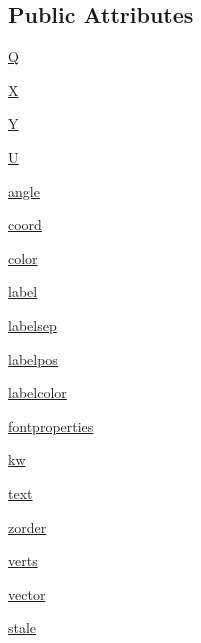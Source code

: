 \subsection*{Public Attributes}
\begin{DoxyCompactItemize}
\item 
\hyperlink{classmatplotlib_1_1quiver_1_1QuiverKey_a87241e8441235ea44da1e26fa249c67f}{Q}
\item 
\hyperlink{classmatplotlib_1_1quiver_1_1QuiverKey_a677b96d69627db6cf8271ace161e4920}{X}
\item 
\hyperlink{classmatplotlib_1_1quiver_1_1QuiverKey_a79d4345f46bc99ce0c3d11cd1001c503}{Y}
\item 
\hyperlink{classmatplotlib_1_1quiver_1_1QuiverKey_a24e4cdf1a8fe12f3a1da49dd55dd614c}{U}
\item 
\hyperlink{classmatplotlib_1_1quiver_1_1QuiverKey_ab781e7037ad3d4d853fd80862f87841a}{angle}
\item 
\hyperlink{classmatplotlib_1_1quiver_1_1QuiverKey_ada90bec5274f6ab30bac47644119aea7}{coord}
\item 
\hyperlink{classmatplotlib_1_1quiver_1_1QuiverKey_a43b0eb9bfaf8244e74093582cc060410}{color}
\item 
\hyperlink{classmatplotlib_1_1quiver_1_1QuiverKey_a5f746ef608190ecafe748ca3a6e79010}{label}
\item 
\hyperlink{classmatplotlib_1_1quiver_1_1QuiverKey_a3e3c2f5f406415fcc575f1cb73545256}{labelsep}
\item 
\hyperlink{classmatplotlib_1_1quiver_1_1QuiverKey_a13fa5350971641227ee0278a9da4690f}{labelpos}
\item 
\hyperlink{classmatplotlib_1_1quiver_1_1QuiverKey_ae7b1495b7dbbbf21f6939fb433f46a21}{labelcolor}
\item 
\hyperlink{classmatplotlib_1_1quiver_1_1QuiverKey_af7746ad76a195c89210bbc7cd1caeb49}{fontproperties}
\item 
\hyperlink{classmatplotlib_1_1quiver_1_1QuiverKey_aef670dbf8f0ddb8e8b7aca95d1c0db80}{kw}
\item 
\hyperlink{classmatplotlib_1_1quiver_1_1QuiverKey_afea3fe54d1f761b1958ebbf72f7d895d}{text}
\item 
\hyperlink{classmatplotlib_1_1quiver_1_1QuiverKey_a853c66d0e9d35e7d555a0304052c80d3}{zorder}
\item 
\hyperlink{classmatplotlib_1_1quiver_1_1QuiverKey_a05339b11ebe278b16fc1f5c35ddd923d}{verts}
\item 
\hyperlink{classmatplotlib_1_1quiver_1_1QuiverKey_a8c26f6b97cf7f24c0de5cddcb82a917f}{vector}
\item 
\hyperlink{classmatplotlib_1_1quiver_1_1QuiverKey_ac542507dd32ac3ebe216cd8a9a709d88}{stale}
\end{DoxyCompactItemize}
